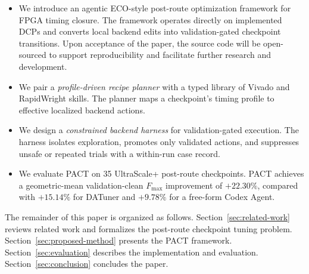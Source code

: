 \documentclass[conference]{IEEEtran}
\begin{document}
\begin{itemize}
\item We introduce an agentic ECO-style post-route optimization
framework for FPGA timing closure. The framework operates directly on
implemented DCPs and converts local backend edits into validation-gated
checkpoint transitions.
Upon acceptance of the paper, the source code will be open-sourced to support reproducibility and facilitate further research and development.

\item We pair a \emph{profile-driven recipe planner} with a typed
library of Vivado and RapidWright skills. The planner maps a
checkpoint's timing profile to effective localized backend actions.

\item We design a \emph{constrained backend harness} for validation-gated execution. The harness isolates exploration, promotes only
validated actions, and suppresses unsafe or repeated trials with a
within-run case record.

\item We evaluate PACT on 35 UltraScale+ post-route checkpoints. PACT
achieves a geometric-mean validation-clean $F_{\max}$ improvement of
$+22.30\%$, compared with $+15.14\%$ for DATuner and $+9.78\%$ for a
free-form Codex Agent.
\end{itemize}

The remainder of this paper is organized as follows.
Section~\ref{sec:related-work} reviews related work and formalizes the
post-route checkpoint tuning problem. Section~\ref{sec:proposed-method}
presents the PACT framework. Section~\ref{sec:evaluation} describes the
implementation and evaluation. Section~\ref{sec:conclusion} concludes
the paper.





\end{document}
